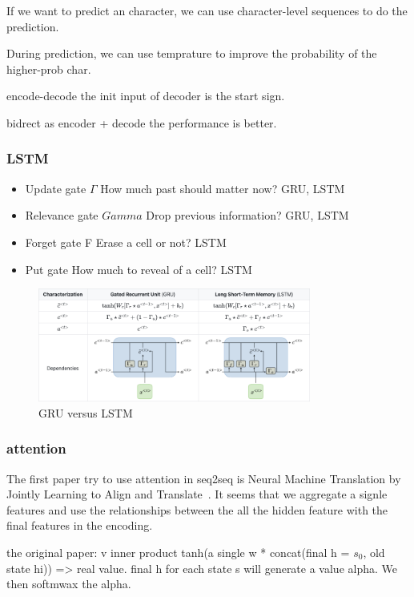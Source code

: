 \documentclass[UTF8]{article}
\begin{document}
If we want to predict an character, we can use character-level sequences to do the prediction.

During prediction, we can use temprature to improve the probability of the higher-prob char.

encode-decode the init input of decoder is the start sign.

bidrect as encoder + decode the performance is better.
\subsubsection{LSTM}
\begin{itemize}
    \item Update gate $\Gamma$ How much past should matter now?	GRU, LSTM
    \item Relevance gate $Gamma$ Drop previous information?	GRU, LSTM
    \item Forget gate F Erase a cell or not?	LSTM
    \item Put gate How much to reveal of a cell?	LSTM
\end{itemize}
\begin{figure}[htbp]
\caption{GRU versus LSTM}
\centering
\includegraphics[width=0.8\textwidth]{stanford.edu__shervine_teaching_cs-230_cheatsheet-recurrent-neural-networks-2.png}
\end{figure}
\subsubsection{attention}
The first paper try to use attention in seq2seq is Neural Machine Translation by Jointly Learning to Align and Translate~\cite{bahdanau2014neural}. It seems that we aggregate a signle features and use the relationships between the all the hidden feature with the final features in the encoding.

the original paper: v inner product tanh(a single w * concat(final h = $s_0$, old state hi)) => real value. final h for each state s will generate a value alpha. We then softmwax the alpha.
\end{document}
